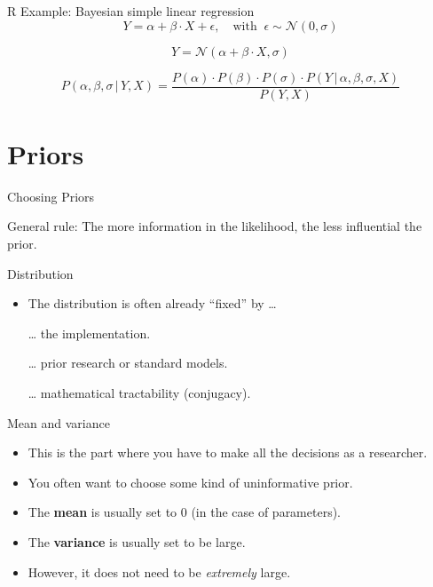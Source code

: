 \documentclass[10pt,handout]{beamer}
\begin{document}
\begin{frame}[c]{R Example: Bayesian simple linear regression}
    $$Y = \alpha + \beta \cdot X + \epsilon , \quad\text{with}\;\; \epsilon \sim \mathcal{N}(0, \sigma )$$

  $$Y = \mathcal{N}(\alpha + \beta \cdot X, \sigma)$$

  $$P\left(\alpha , \beta , \sigma\, |\, Y, X\right) = \frac{P(\alpha ) \cdot P\left(\beta \right) \cdot P\left(\sigma \right) \cdot P\left(Y\, |\, \alpha , \beta , \sigma , X\right)}{P\left(Y, X\right)}$$
\end{frame}

\section{Priors}%
\label{sec:convergence}

\begin{frame}[t]{Choosing Priors}

  General rule: The more information in the likelihood, the less influential the prior.

  \begin{block}{Distribution}
  \begin{itemize}
    \item The distribution is often already \enquote{fixed} by \dots
    \item[\dots] the implementation.
    \item[\dots] prior research or standard models.
    \item[\dots] mathematical tractability (conjugacy).
  \end{itemize}
  \end{block}

  \begin{block}{Mean and variance}
  \begin{itemize}
    \item This is the part where you have to make all the decisions as a researcher.
    \item You often want to choose some kind of uninformative prior.
    \item The \textbf{mean} is usually set to 0 (in the case of parameters).
    \item The \textbf{variance} is usually set to be large.
    \item However, it does not need to be \textit{extremely} large.
  \end{itemize}
  \end{block}

\end{frame}
\end{document}
